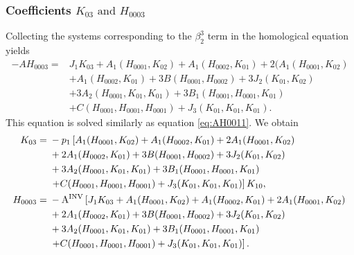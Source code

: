 \subsubsection{Coefficients \texorpdfstring{$K_{03} \text{ and } H_{0003}$}{K03
				and H0003}}
\label{subsubsection:K03_H0003}

Collecting the systems corresponding to the $\beta_2^3$ term in the
homological equation yields
\begin{equation*}
\begin{aligned}
-A H_{0003} ={}& J_1 K_{03} + A_1(H_{0001},K_{02}) + A_1(H_{0002},K_{01})
				+ 2 (A_1(H_{0001},K_{02}) \\
				& + A_1(H_{0002},K_{01}) + 3 B(H_{0001},H_{0002}) + 3 J_2(K_{01},K_{02})
				\\
				& + 3 A_2(H_{0001},K_{01},K_{01}) + 3 B_1(H_{0001},H_{0001},K_{01}) \\
				& + C(H_{0001},H_{0001},H_{0001}) + J_3(K_{01},K_{01},K_{01}).
\end{aligned}
\end{equation*}
This equation is solved similarly as equation \cref{eq:AH0011}. We obtain
\begin{equation*}
\begin{aligned}
K_{03}={}& -p_1 \left[ A_1(H_{0001},K_{02}) + A_1(H_{0002},K_{01})
				+ 2 A_1(H_{0001},K_{02}) \right. \\
				& + 2 A_1(H_{0002},K_{01}) + 3 B(H_{0001},H_{0002}) + 3 J_2(K_{01},K_{02})
				\\
				& + 3 A_2(H_{0001},K_{01},K_{01}) + 3 B_1(H_{0001},H_{0001},K_{01}) \\
				& \left. + C(H_{0001},H_{0001},H_{0001}) +
				J_3(K_{01},K_{01},K_{01}) \right] K_{10}, \\
H_{0003} ={}& -\operatorname{A^{\text{INV}}} \left[ J_1 K_{03} + A_1(H_{0001},K_{02}) +
				A_1(H_{0002},K_{01}) + 2 A_1(H_{0001},K_{02}) \right. \\
				& + 2 A_1(H_{0002},K_{01}) + 3 B(H_{0001},H_{0002}) + 3 J_2(K_{01},K_{02})
				\\
				& + 3 A_2(H_{0001},K_{01},K_{01}) + 3 B_1(H_{0001},H_{0001},K_{01}) \\
				& \left. + C(H_{0001},H_{0001},H_{0001}) +
				J_3(K_{01},K_{01},K_{01})\right] .
\end{aligned}
\end{equation*}

